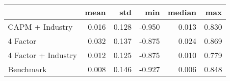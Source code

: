 \begin{tabular}{lrrrrr}
\toprule
{} &   mean &    std &    min &  median &    max \\
\midrule
 CAPM + Industry    &  0.016 &  0.128 & -0.950 &   0.013 &  0.830 \\
4 Factor            &  0.032 &  0.137 & -0.875 &   0.024 &  0.869 \\
4 Factor + Industry &  0.012 &  0.125 & -0.875 &   0.010 &  0.779 \\
Benchmark           &  0.008 &  0.146 & -0.927 &   0.006 &  0.848 \\
\bottomrule
\end{tabular}
